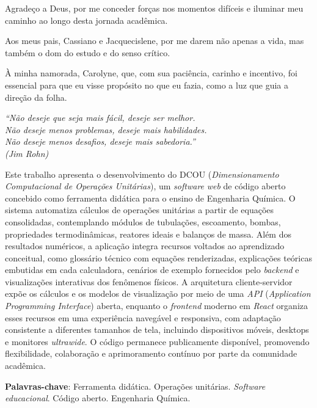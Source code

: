 \documentclass[
	12pt,				%
	openright,			%
	twoside,			%
	a4paper,			%
	english,			%
	brazil				%
	]{abntex2}
\begin{document}

\begin{agradecimentos}
Agradeço a Deus, por me conceder forças nos momentos difíceis e iluminar meu caminho ao longo desta jornada acadêmica.

Aos meus pais, Cassiano e Jacquecislene, por me darem não apenas a vida, mas também o dom do estudo e do senso crítico.

À minha namorada, Carolyne, que, com sua paciência, carinho e incentivo, foi essencial para que eu visse propósito no que eu fazia, como a luz que guia a direção da folha.
\end{agradecimentos}

\begin{epigrafe}
    \vspace*{\fill}
	\begin{flushright}
		\textit{``Não deseje que seja mais fácil, deseje ser melhor.\\
		Não deseje menos problemas, deseje mais habilidades.\\
		Não deseje menos desafios, deseje mais sabedoria.''\\
		(Jim Rohn)}
	\end{flushright}
\end{epigrafe}


\setlength{\absparsep}{18pt} %
\begin{resumo}
Este trabalho apresenta o desenvolvimento do DCOU (\textit{Dimensionamento Computacional de Operações Unitárias}), um \textit{software} \textit{web} de código aberto concebido como ferramenta didática para o ensino de Engenharia Química. O sistema automatiza cálculos de operações unitárias a partir de equações consolidadas, contemplando módulos de tubulações, escoamento, bombas, propriedades termodinâmicas, reatores ideais e balanços de massa. Além dos resultados numéricos, a aplicação integra recursos voltados ao aprendizado conceitual, como glossário técnico com equações renderizadas, explicações teóricas embutidas em cada calculadora, cenários de exemplo fornecidos pelo \textit{backend} e visualizações interativas dos fenômenos físicos. A arquitetura cliente-servidor expõe os cálculos e os modelos de visualização por meio de uma \textit{API} (\textit{Application Programming Interface}) aberta, enquanto o \textit{frontend} moderno em \textit{React} organiza esses recursos em uma experiência navegável e responsiva, com adaptação consistente a diferentes tamanhos de tela, incluindo dispositivos móveis, desktops e monitores \textit{ultrawide}. O código permanece publicamente disponível, promovendo flexibilidade, colaboração e aprimoramento contínuo por parte da comunidade acadêmica.

 \textbf{Palavras-chave}: Ferramenta didática. Operações unitárias. \textit{Software educacional}. Código aberto. Engenharia Química.
\end{resumo}
\end{document}
